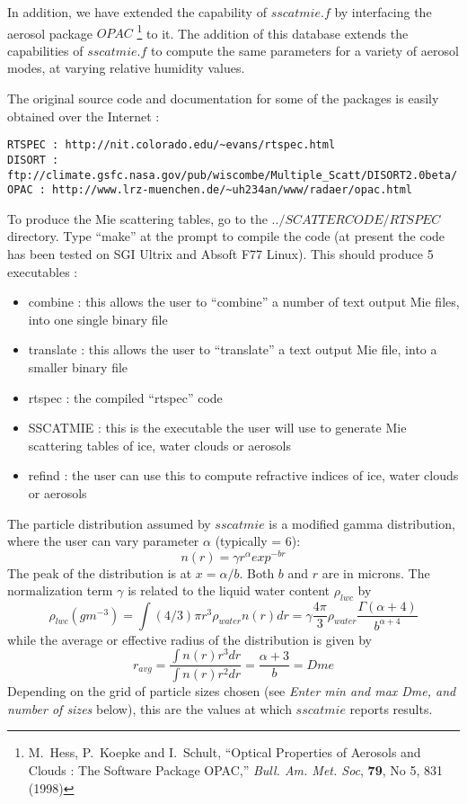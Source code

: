 \documentclass[12pt]{article}
\begin{document}
In addition, we have extended the capability of $sscatmie.f$ by interfacing
the aerosol package $OPAC$ 
\footnote{M.~Hess, P.~Koepke and I.~Schult, ``Optical Properties of Aerosols 
and Clouds : The Software Package OPAC,'' {\em Bull. Am. Met. Soc}, {\bf 79}, 
No 5, 831 (1998)} to it. The addition of this database extends the 
capabilities of $sscatmie.f$ to compute the same parameters 
for a variety of aerosol modes, at varying relative humidity values.

The original source code and documentation for some of the packages is 
easily obtained over the Internet : \\
\begin{verbatim}
RTSPEC : http://nit.colorado.edu/~evans/rtspec.html
DISORT : ftp://climate.gsfc.nasa.gov/pub/wiscombe/Multiple_Scatt/DISORT2.0beta/
OPAC : http://www.lrz-muenchen.de/~uh234an/www/radaer/opac.html
\end{verbatim}

To produce the Mie scattering tables, go to the $../SCATTERCODE/RTSPEC$ 
directory. Type ``make'' at the prompt to compile the code (at present the
code has been tested on SGI Ultrix and Absoft F77 Linux).
This should produce 5 executables :\\
\begin{itemize}
\item combine : this allows the user to ``combine'' a number of text output
                Mie files, into one single binary file
\item translate : this allows the user to ``translate'' a text output
                Mie file, into a smaller binary file
\item rtspec : the compiled ``rtspec'' code
\item SSCATMIE : this is the executable the user will use to generate Mie
                 scattering tables of ice, water clouds or aerosols
\item refind : the user can use this to compute refractive indices of ice, 
               water clouds or aerosols
\end{itemize}

The particle distribution assumed by $sscatmie$ is a modified gamma 
distribution, where the user can vary parameter $\alpha$ (typically = 6): 
\[
n(r) = \gamma r^{\alpha} exp^{-br}
\]
The peak of the distribution is at $x = \alpha/b$. Both $b$ and $r$ are in 
microns. The normalization term $\gamma$ is related to the liquid water 
content $\rho_{lwc}$ by
\[
\rho_{lwc} (g m^{-3}) = \int (4/3)\pi r^3 \rho_{water} n(r) dr = 
\gamma  \frac{4 \pi}{3} \rho_{water} \frac{\Gamma(\alpha+4)}{b^{\alpha+4}}
\]
while the average or effective radius of the distribution is given by
\[
r_{avg} = \frac{\int n(r) r^3 dr}{\int n(r) r^2 dr} = \frac{\alpha+3}{b} = Dme
\]
Depending on the grid of particle sizes chosen (see {\em Enter min and max 
Dme, and number of sizes} below), this are the values at which $sscatmie$ 
reports results. 
\end{document}
